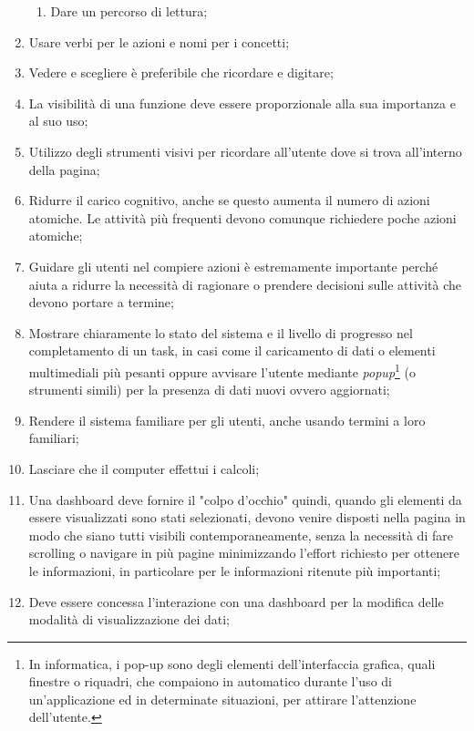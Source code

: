 \begin{enumerate}
\begin{enumerate}[label=\alph*.]
        \item Dare un percorso di lettura; \label{lg:5.b}
    \end{enumerate}
    \item Usare verbi per le azioni e nomi per i concetti; \label{lg:6}
    \item Vedere e scegliere è preferibile che ricordare e digitare;\label{lg:7}
    \item La visibilità di una funzione deve essere proporzionale alla sua importanza e al suo uso;\label{lg:8}
    \item Utilizzo degli strumenti visivi per ricordare all'utente dove si trova all'interno della pagina;\label{lg:9}
    \item Ridurre il carico cognitivo, anche se questo aumenta il numero di azioni atomiche. Le attività più frequenti devono comunque richiedere poche azioni atomiche;\label{lg:10}
    \item Guidare gli utenti nel compiere azioni è estremamente importante perché aiuta a ridurre la necessità di ragionare o prendere decisioni sulle attività che devono portare a termine;\label{lg:11}
    \item Mostrare chiaramente lo stato del sistema e il livello di progresso nel completamento di un task, in casi come il caricamento di dati o elementi multimediali più pesanti oppure avvisare l'utente mediante \textit{popup}\footnote{In informatica, i pop-up sono degli elementi dell'interfaccia grafica, quali finestre o riquadri, che compaiono in automatico durante l'uso di un'applicazione ed in determinate situazioni, per attirare l'attenzione dell'utente.} (o strumenti simili) per la presenza di dati nuovi ovvero aggiornati;\label{lg:12}
    \item Rendere il sistema familiare per gli utenti, anche usando termini a loro familiari;\label{lg:13}
    \item Lasciare che il computer effettui i calcoli;\label{lg:14}
    \item Una dashboard deve fornire il "colpo d'occhio" quindi, quando gli elementi da essere visualizzati sono stati selezionati, devono venire disposti nella pagina in modo che siano tutti visibili contemporaneamente, senza la necessità di fare scrolling o navigare in più pagine minimizzando l'effort richiesto per ottenere le informazioni, in particolare per le informazioni ritenute più importanti;\label{lg:15}
    \item Deve essere concessa l'interazione con una dashboard per la modifica delle modalità di visualizzazione dei dati;\label{lg:16}

\end{enumerate}
